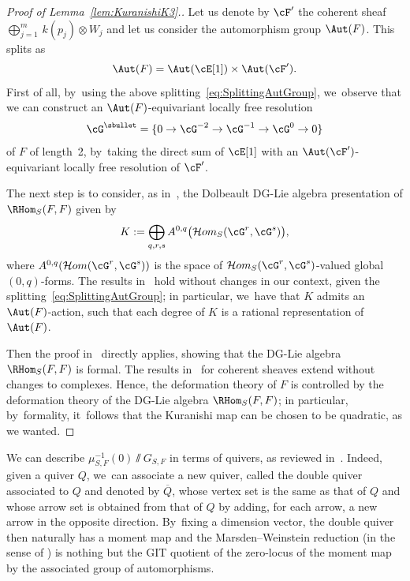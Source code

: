 \begin{proof}[Proof of Lemma~\ref{lem:KuranishiK3}.]
Let us denote by $\cF'$ the coherent sheaf $\bigoplus_{j=1}^m\, k(p_j)\otimes W_j$ and let us consider the automorphism group $\Aut(F)$.
This splits as
\begin{equation}\label{eq:SplittingAutGroup}
\Aut(F) = \Aut(\cE[1]) \times \Aut(\cF').
\end{equation}
First of all, by~using the above splitting~\eqref{eq:SplittingAutGroup}, we~observe that we can construct an $\Aut(F)$-equivariant locally free resolution
\[
\cG^\sbullet=\{0\to \cG^{-2} \to \cG^{-1} \to \cG^0 \to 0 \}
\]
of $F$ of length~2, by~taking the direct sum of $\cE[1]$ with an $\Aut(\cF')$-equivariant locally free resolution of $\cF'$.

The next step is to consider, as in~\cite[\S 5]{BMM:Formality}, the Dolbeault DG-Lie algebra presentation of $\RHom_S(F,F)$ given by
\[
K:=\bigoplus_{q,r,s} A^{0,q}\bigl(\mathcal{H}om_S(\cG^r,\cG^s) \bigr),
\]
where $A^{0,q}(\mathcal{H}om(\cG^r,\cG^s))$ is the space of $\mathcal{H}om_S(\cG^r,\cG^s)$-valued global $(0,q)$-forms.
The results in~\cite[\S 3]{BMM:Quadraticity} hold without changes in our context, given the splitting~\eqref{eq:SplittingAutGroup}; in particular, we~have that $K$ admits an $\Aut(F)$-action, such that each degree of $K$ is a rational representation of $\Aut(F)$.

Then the proof in~\cite[Th.\,5.1]{BMM:Formality} directly applies, showing that the DG-Lie algebra $\RHom_S(F,F)$ is formal.
The results in~\cite{FIM:dgla} for coherent sheaves extend without changes to complexes. Hence, the deformation theory of $F$ is controlled by the deformation theory of the DG-Lie algebra $\RHom_S(F,F)$; in particular, by~formality, it~follows that the Kuranishi map can be chosen to be quadratic, as we wanted.
\end{proof}

We can describe $\mu^{-1}_{S,F}(0)\sslash G_{S,F}$ in terms of quivers, as reviewed in~\cite[\S 4]{AS:Formality}.
Indeed, given a quiver $Q$, we~can associate a new quiver, called the double quiver associated to $Q$ and denoted by $\overline{Q}$, whose vertex set is the same as that of $Q$ and whose arrow set is obtained from that of $Q$ by adding, for each arrow, a new arrow in the opposite direction. By~fixing a dimension vector, the double quiver then naturally has a moment map and the Marsden--Weinstein reduction (in the sense of \hbox{\cite[\S 1]{CB:normality}}) is nothing but the GIT quotient of the zero-locus of the moment map by the associated group of automorphisms.

